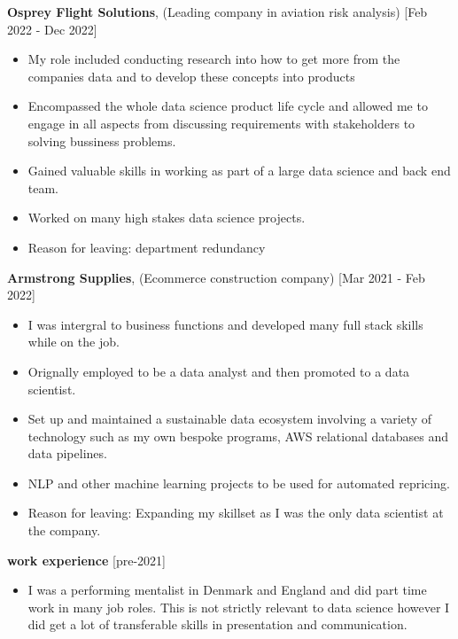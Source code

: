 \documentclass[10pt]{article}
\begin{document}
{\begin{itemize}
\end{itemize}

{\bf Osprey Flight Solutions}, (Leading company in aviation risk analysis) [Feb 2022 - Dec 2022]
\begin{itemize}
\setlength{\itemsep}{0.10ex}
\item My role included conducting research into how to get more from the companies
data and to develop these concepts into products
\item Encompassed the whole data science product
life cycle and allowed me to engage in all aspects from discussing requirements with stakeholders to
solving bussiness problems.
\item Gained valuable skills in working as part of a large data science and back end team.
\item Worked on many high stakes data science projects.
\item Reason for leaving: department redundancy
\end{itemize}

{\bf Armstrong Supplies}, (Ecommerce construction company) 	[Mar 2021 - Feb 2022]
\begin{itemize}
\setlength{\itemsep}{0.10ex}
\item I was intergral to business functions and developed many full stack skills while on the job.
\item Orignally employed to be a data analyst and then promoted to a data scientist.
\item Set up and maintained a sustainable data ecosystem involving a variety of
technology such as my own bespoke programs, AWS relational databases and data pipelines.
\item NLP and other machine learning projects to be used for automated repricing.
\item Reason for leaving: Expanding my skillset as I was the only data scientist at the company.
\end{itemize}

{\bf work experience} [pre-2021]
\begin{itemize}
\setlength{\itemsep}{0.10ex}
\item I was a performing mentalist in Denmark and England and did part time work in many job roles. This is not strictly relevant to data science however I did get a lot of transferable skills in presentation and communication.
\end{itemize}






}
\end{document}
